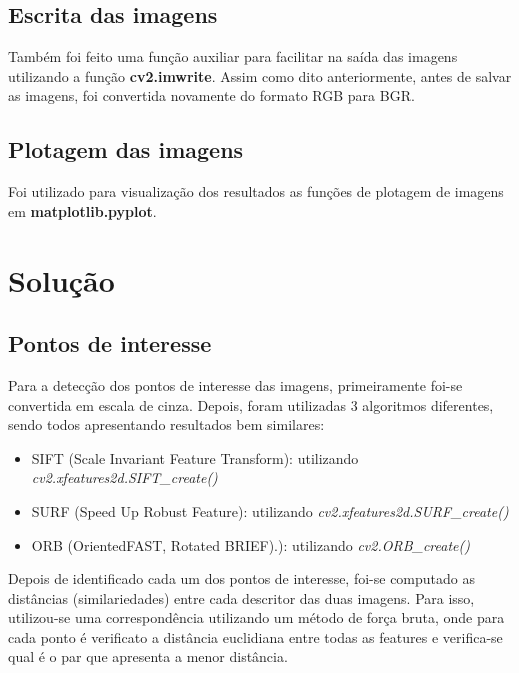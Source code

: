 \documentclass{article}
\begin{document}
\subsection{Escrita das imagens}

Também foi feito uma função auxiliar para facilitar na saída das imagens utilizando a função \textbf{cv2.imwrite}. Assim como dito anteriormente, antes de salvar as imagens, foi convertida novamente do formato RGB para BGR.

\subsection{Plotagem das imagens}

Foi utilizado para visualização dos resultados as funções de plotagem de imagens em \textbf{matplotlib.pyplot}.

\section{Solução}

\subsection{Pontos de interesse}

 Para a detecção dos pontos de interesse das imagens, primeiramente foi-se convertida em escala de cinza. Depois, foram utilizadas 3 algoritmos diferentes, sendo todos apresentando resultados bem similares:

 \begin{itemize}
  \item SIFT (Scale Invariant Feature Transform): utilizando \textit{cv2.xfeatures2d.SIFT\_create()}
  

  \item SURF (Speed Up Robust Feature): utilizando \textit{cv2.xfeatures2d.SURF\_create()}
  
  \item ORB (OrientedFAST, Rotated BRIEF).): utilizando \textit{cv2.ORB\_create()}

\end{itemize}

Depois de identificado cada um dos pontos de interesse, foi-se computado as distâncias (similariedades) entre cada descritor das duas imagens. Para isso, utilizou-se uma correspondência utilizando um método de força bruta, onde para cada ponto é verificato a distância euclidiana entre todas as features  e verifica-se qual é o par que apresenta a menor distância.
\end{document}
